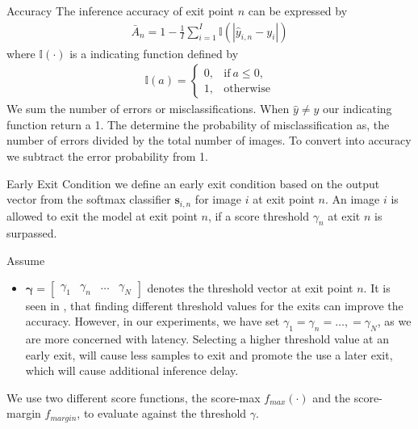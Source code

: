 \begin{enumdescript}
\begin{enumdescript}
			\item[Accuracy] The inference accuracy of exit point $ n $ can be expressed by
			\begin{align}
			\bar{A}_{n}=1-\frac{1}{I} \sum_{i=1}^{I} \mathbb{I}\left(\left|\hat{y}_{i,n}-y_{i}\right|\right) \label{eq:accuracy}
			\end{align}
			where $ \mathbb{I(\cdot)}  $ is a indicating function defined by
			\begin{align}
			\mathbb{I}(a)= \begin{cases}
			0, & \mathrm{if\:} a \leq 0, \\
			1, & \mathrm{otherwise}
			\end{cases}
			\end{align}
			We sum the number of errors or misclassifications. When $ \hat{y} \neq y $ our indicating function return a 1. The determine the probability of misclassification as, the number of errors divided by the total number of images. To convert into accuracy we subtract the error probability from 1.    
			
			
			
		\end{enumdescript}
	
		\item[Early Exit Condition] we define an early exit condition based on the output vector from the softmax classifier $ \bm{s}_{i,n} $ for image $ i $ at exit point $ n $. An image $ i $ is allowed to exit the model at exit point $ n $, if a score threshold $ \gamma_n $ at exit $ n $ is surpassed.
		
		Assume
		\begin{itemize}
			\item $ \bm{\gamma} = \left[\begin{array}{cccc}
			\gamma_{1} & \gamma_{n} & \dots & \gamma_{N} \end{array}\right]  $ denotes the threshold vector at exit point $ n $. It is seen in \cite{teerapittayanon_finding_2018}, that finding different threshold values for the exits can improve the accuracy. However, in our experiments, we have set $ \gamma_{1} = \gamma_{n} = \dots, = \gamma_{N}  $, as we are more concerned with latency. Selecting a higher threshold value at an early exit, will cause less samples to exit and promote the use a later exit, which will cause additional inference delay.
		\end{itemize}
		
		We use two different score functions, the score-max $ f_{max}(\cdot) $ and the score-margin $ f_{margin} $, to evaluate against the threshold $ \gamma $. 
		

\end{enumdescript}
